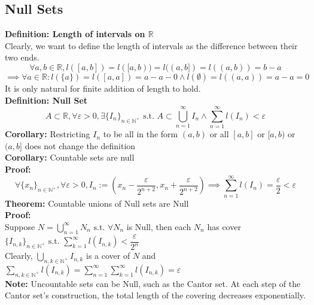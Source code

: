 \documentclass{article}
\newcommand{\R}{\mathbb{R}}
\newcommand{\N}{\mathbb{N}}
\newcommand{\st}{\mbox{ s.t. }}
\newcommand{\0}{{\bf{0}}}
\newcommand{\1}{{\bf{1}}}
\begin{document}
\subsection{Null Sets}
\textbf{Definition: Length of intervals on $\R$}\\
Clearly, we want to define the length of intervals as the difference between their two ends.
$$\forall a,b\in\R,l([a,b])=l([a,b))=l((a,b])=l((a,b))=b-a$$
$$\implies\forall a\in\R:l(\{a\})=l([a,a])=a-a-0\land l(\emptyset)=l((a,a))=a-a=0$$
It is only natural for finite addition of length to hold.\\
\textbf{Definition: Null Set}
$$A\subset\R,\forall\varepsilon>0,\exists\{I_n\}_{n\in\N^+}\st A\subset\bigcup_{n=1}^\infty I_n\land\sum_{n=1}^\infty l(I_n)<\varepsilon$$
\textbf{Corollary:} Restricting $I_n$ to be all in the form $(a,b)$ or all $[a,b]$ or $[a,b)$ or $(a,b]$ does not change the definition\\
\textbf{Corollary:} Countable sets are null\\
\textbf{Proof:}
$$\forall\{x_n\}_{n\in\N^+},\forall\varepsilon>0,I_n:=\left(x_n-\frac{\varepsilon}{2^{n+2}},x_n+\frac{\varepsilon}{2^{n+2}}\right)\implies\sum_{n=1}^\infty l(I_n)=\frac{\varepsilon}{2}<\varepsilon$$
\textbf{Theorem:} Countable unions of Null sets are Null\\
\textbf{Proof:}\\
Suppose $N=\displaystyle\bigcup_{n=1}^\infty N_n\st\forall N_n$ is Null, then each $N_n$ has cover $\{I_{n,k}\}_{n\in\N^+}\st\displaystyle\sum_{k=1}^\infty l(I_{n,k})<\dfrac{\varepsilon}{2^n}$\\
Clearly, $\displaystyle\bigcup_{n,k\in\N^+}I_{n,k}$ is a cover of $N$ and $\displaystyle\sum_{n,k\in\N^+}l(I_{n,k})=\displaystyle\sum_{n=1}^\infty\displaystyle\sum_{k=1}^\infty l(I_{n,k})=\varepsilon$\\
\textbf{Note:} Uncountable sets can be Null, such as the Cantor set. At each step of the Cantor set's construction, the total length of the covering decreases exponentially. 
\end{document}
